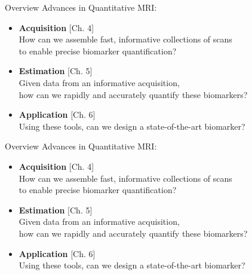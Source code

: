 \documentclass{beamer}
\begin{document}
\begin{frame}{Overview}
	Advances in Quantitative MRI: 
	\begin{itemize}
		\item<1>{
			\textbf{Acquisition} \hfill \textcolor{arch-ivy}{[Ch. 4]} \\
			How can we assemble fast, informative collections of scans \\
			to enable precise biomarker quantification? 
		}
		
		\item<0>{
			\textbf{Estimation} \hfill \textcolor{arch-ivy}{[Ch. 5]} \\
			Given data from an informative acquisition, \\
			how can we rapidly and accurately quantify these biomarkers?
		}
		\item<0>{
			\textbf{Application} \hfill \textcolor{arch-ivy}{[Ch. 6]} \\
			Using these tools,
			can we design a state-of-the-art biomarker?
		}
	\end{itemize}
\end{frame}



\begin{frame}{Overview}
	Advances in Quantitative MRI: 
	\begin{itemize}
		\item<0>{
			\textbf{Acquisition} \hfill \textcolor{arch-ivy}{[Ch. 4]} \\
			How can we assemble fast, informative collections of scans \\
			to enable precise biomarker quantification? 
		}
		\item<1>{
			\textbf{Estimation} \hfill \textcolor{arch-ivy}{[Ch. 5]} \\
			Given data from an informative acquisition, \\
			how can we rapidly and accurately quantify these biomarkers?
		}
		\item<0>{
			\textbf{Application} \hfill \textcolor{arch-ivy}{[Ch. 6]} \\
			Using these tools,
			can we design a state-of-the-art biomarker?
		}
	\end{itemize}
\end{frame}


\end{document}
